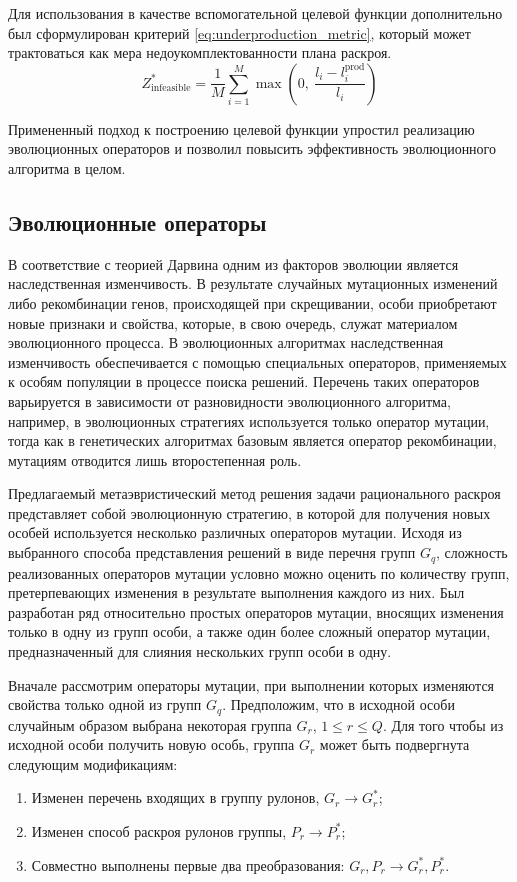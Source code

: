 \documentclass[12pt]{article}
\begin{document}
Для использования в качестве вспомогательной целевой функции дополнительно был 
сформулирован критерий 
\eqref{eq:underproduction_metric}, 
который может трактоваться как мера 
недоукомплектованности плана раскроя.
\begin{equation}\label{eq:underproduction_metric}
    Z_{\text{infeasible}}^{*}=\frac{1}{M} 
       \sum_{i=1}^{M} \max{\left( 0, \: \frac{l_i-l_i^{\text{prod}}}{l_i} \right)}
\end{equation}

Примененный подход к построению целевой функции упростил реализацию 
эволюционных операторов и позволил повысить эффективность эволюционного 
алгоритма в целом.

\subsection{Эволюционные операторы}

В соответствие с теорией Дарвина одним из факторов эволюции является 
наследственная изменчивость. В результате случайных мутационных изменений либо 
рекомбинации генов, происходящей при скрещивании, особи приобретают новые 
признаки и свойства, которые, в свою очередь, служат материалом эволюционного 
процесса. В эволюционных алгоритмах наследственная изменчивость обеспечивается 
с помощью специальных операторов, применяемых к особям популяции в процессе 
поиска решений. Перечень таких операторов варьируется в зависимости от 
разновидности эволюционного алгоритма, например, в эволюционных стратегиях 
используется только оператор мутации, тогда как в генетических алгоритмах 
базовым является оператор рекомбинации, мутациям отводится лишь второстепенная 
роль.

Предлагаемый метаэвристический метод решения задачи рационального раскроя 
представляет собой эволюционную стратегию, в которой для получения новых 
особей используется несколько различных операторов мутации. Исходя из 
выбранного способа представления решений в виде перечня групп $G_q$, сложность 
реализованных операторов мутации условно можно оценить по количеству групп, 
претерпевающих изменения в результате выполнения каждого из них. Был 
разработан ряд относительно простых операторов мутации, вносящих изменения 
только в одну из групп особи, а также один более сложный оператор мутации, 
предназначенный для слияния нескольких групп особи в одну.

Вначале рассмотрим операторы мутации, при выполнении которых изменяются 
свойства только одной из групп $G_q$. Предположим, что в исходной особи 
случайным образом выбрана некоторая группа $G_r$, $1 \leq r \leq Q$. Для того 
чтобы из исходной особи получить новую особь, группа $G_r$ может быть 
подвергнута следующим модификациям:
\begin{enumerate}
    \item Изменен перечень входящих в группу рулонов, $G_r \rightarrow G_r^*$;
    \item Изменен способ раскроя рулонов группы, $P_r \rightarrow P_r^*$;
    \item Совместно выполнены первые два преобразования: $
          G_r,P_r \rightarrow G_r^*,P_r^*$.
\end{enumerate}
\end{document}
